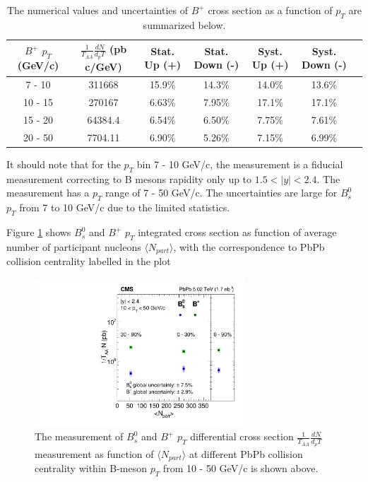 \begin{table}[h]
\begin{center}
\caption{The numerical values and uncertainties of $B^+$ cross section as a function of $p_T$ are summarized below.}
\vspace{1em}
\label{BsXsectPt}
  \begin{tabular}{| c | c |c | c| c| c| c|}
    \hline
$B^+$ $p_T$ (GeV/c) &  $\frac{1}{T_{AA}} \frac{dN}{d_pT}$ (pb c/GeV) & Stat. Up (+)   & Stat. Down (-)  &  Syst. Up (+)  &  Syst. Down (-) \\
    \hline
    \hline
 7 - 10 &   311668  &  15.9\% & 14.3\% & 14.0\% & 13.6\% \\ 
 10 - 15 & 270167  & 6.63\%  & 7.95\%  & 17.1\% & 17.1\% \\ 
 15 - 20 &  64384.4 & 6.54\%   &  6.50\% & 7.75\% & 7.61\% \\ 
 20 - 50 &  7704.11    & 6.90\%  &  5.26\% & 7.15\% &6.99\% \\ 
    \hline
    \hline
\end{tabular}
\end{center}
\end{table}

It should note that for the $p_T$ bin 7 - 10 GeV/c, the measurement is a fiducial measurement correcting to B mesons rapidity only up to $1.5 < |y| < 2.4$. The measurement has a $p_T$ range of 7 - 50 GeV/c. The uncertainties are large for $B^0_s$ $p_T$ from 7 to 10 GeV/c due to the limited statistics. 



Figure \ref{BmesonDataCent} shows $B^0_s$ and $B^+$ $p_T$ integrated cross section as function of average number of participant nucleons $\langle N_{part}\rangle$, with the correspondence to PbPb collision centrality labelled in the plot
 

\begin{figure}[hbtp]
\begin{center}
\includegraphics[width=0.70\textwidth]{Figures/Chapter4/xsec_vsCent.pdf}
\caption{The measurement of $B^0_s$ and $B^+$ $p_T$ differential cross section $\frac{1}{T_{AA}} \frac{dN}{d_pT}$ measurement as function of $\langle N_{part}\rangle$ at different PbPb collision centrality within B-meson $p_T$ from 10 - 50 GeV/c is shown above. }
\label{BmesonDataCent}
\end{center}
\end{figure}

